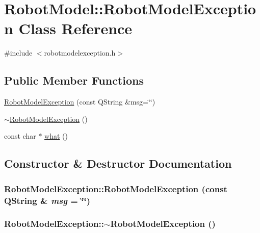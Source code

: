 \hypertarget{class_robot_model_1_1_robot_model_exception}{
\section{RobotModel::RobotModelException Class Reference}
\label{class_robot_model_1_1_robot_model_exception}
}


{\ttfamily \#include $<$robotmodelexception.h$>$}\subsection*{Public Member Functions}
\begin{DoxyCompactItemize}
\item 
\hyperlink{class_robot_model_1_1_robot_model_exception_a0a74e3836cfe0d931c971c94f0c393fa}{RobotModelException} (const QString \&msg=\char`\"{}\char`\"{})
\item 
\hyperlink{class_robot_model_1_1_robot_model_exception_a878614596085eba37b684ecb8d4dfd49}{$\sim$RobotModelException} ()
\item 
const char $\ast$ \hyperlink{class_robot_model_1_1_robot_model_exception_a96661f7c3b0cbb9c815b23c1eb315912}{what} ()
\end{DoxyCompactItemize}


\subsection{Constructor \& Destructor Documentation}
\hypertarget{class_robot_model_1_1_robot_model_exception_a0a74e3836cfe0d931c971c94f0c393fa}{
\subsubsection[{RobotModelException}]{\setlength{\rightskip}{0pt plus 5cm}RobotModelException::RobotModelException (const QString \& {\em msg} = {\ttfamily \char`\"{}\char`\"{}})}}
\label{class_robot_model_1_1_robot_model_exception_a0a74e3836cfe0d931c971c94f0c393fa}
\hypertarget{class_robot_model_1_1_robot_model_exception_a878614596085eba37b684ecb8d4dfd49}{
\subsubsection[{$\sim$RobotModelException}]{\setlength{\rightskip}{0pt plus 5cm}RobotModelException::$\sim$RobotModelException ()}}
\label{class_robot_model_1_1_robot_model_exception_a878614596085eba37b684ecb8d4dfd49}


